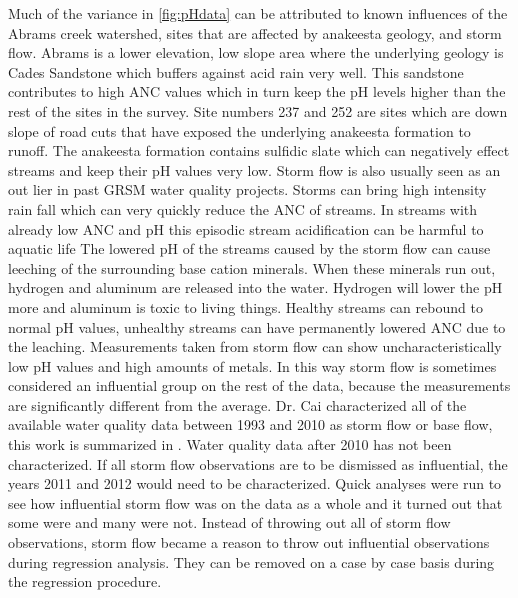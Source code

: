 Much of the variance in \autoref{fig:pHdata} can be attributed to known influences of the Abrams creek watershed, sites that are affected by anakeesta geology, and storm flow.  Abrams is a lower elevation, low slope area where the underlying geology is Cades Sandstone which buffers against acid rain very well.  This sandstone contributes to high ANC values which in turn keep the pH levels higher than the rest of the sites in the survey.  Site numbers 237 and 252 are sites which are down slope of road cuts that have exposed the underlying anakeesta formation  to runoff.  The anakeesta formation contains sulfidic slate which can negatively effect streams and keep their pH values very low.  
Storm flow is also usually seen as an out lier in past GRSM water quality projects.  Storms can bring high intensity rain fall which can very quickly reduce the ANC of streams.  In streams with already low ANC and pH this episodic stream acidification can be harmful to aquatic life \citep{neff2009physiological}  The lowered pH of the streams caused by the storm flow can cause leeching of the surrounding base cation minerals.  When these minerals run out, hydrogen and aluminum are released into the water.  Hydrogen will lower the pH more and aluminum is toxic to living things.  Healthy streams can rebound to normal pH values, unhealthy streams can have permanently lowered ANC due to the leaching. %
 Measurements taken from storm flow can show uncharacteristically low pH values and high amounts of metals.  In this way storm flow is sometimes considered an influential group on the rest of the data, because the measurements are significantly different from the average.  Dr. Cai characterized all of the available water quality data between 1993 and 2010 as storm flow or base flow, this work is summarized in \citet{cai2012}.  Water quality data after 2010 has not been characterized.  If  all storm flow observations are to be dismissed as influential, the years 2011 and 2012 would need to be characterized.  Quick analyses were run to see how influential storm flow was on the data as a whole and it turned out that some were and many were not.  Instead of throwing out all of storm flow observations, storm flow became a reason to throw out influential observations during regression analysis.  They can be removed on a case by case basis during the regression procedure.
 
